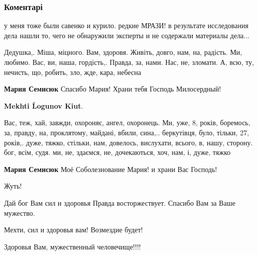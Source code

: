  
 
 
 
 
\subsubsection{Коментарі}
\label{sec:18_11_2021.fb.logunov_mehti.1.prigovor.cmt}

\begin{itemize} %

у меня тоже были савенко и курило. редкие МРАЗИ! в результате исследования дела
нашли то, чего не обнаружили эксперты и не содержали материалы дела...


Дедушка,. Міша, міцного. Вам, здоровя. Живіть, довго, нам, на, радість. Ми,
любимо. Вас, ви, наша, гордість,. Правда, за, нами. Нас, не, зломати. А, всю,
ту, нечисть, що, робить, зло, жде, кара, небесна

\begin{itemize} %
\textbf{Мария Семисюк} Спасибо Мария! Храни тебя Господь Милосердный!

\textbf{Mekhti Ĺogunov Kiut}. 

Вас, теж, хай, завжди, охороняє, ангел, охоронець. Ми, уже, 8, років, боремось,
за, правду, на, проклятому, майдані, вбили, сина,.. беркутівця, було, тільки,
27, років,. дуже, тяжко, стільки, нам, довелось, вислухати, всього, в, нашу,
сторону. бог, всім, судя. ми, не, здаємся, не, дочекаються, хоч, нам, і, дуже,
тяжко

\textbf{Мария Семисюк} Моё Соболезнование Мария! и храни Вас Господь!
\end{itemize} %

Жуть!

Дай бог Вам сил и здоровья
Правда восторжествует. Спасибо Вам за Ваше мужество.

Мехти, сил и здоровья вам! Возмездие будет!

Здоровья Вам, мужественный человечище!!!!



\end{itemize}
